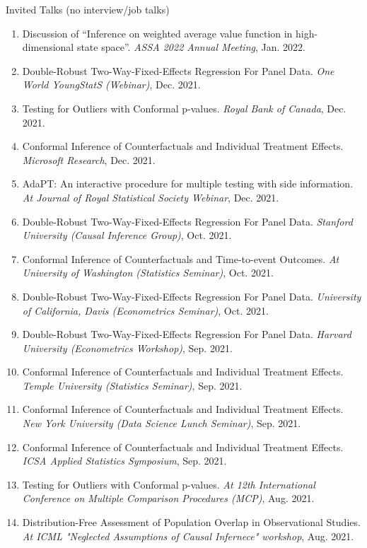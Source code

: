 \documentclass{article}
\begin{document}
\begin{large}
\noindent Invited Talks (no interview/job talks)
\end{large}

\begin{enumerate}
\item Discussion of ``Inference on weighted average value function in high-dimensional state space''. \emph{ASSA 2022 Annual Meeting}, Jan. 2022.
\item Double-Robust Two-Way-Fixed-Effects Regression For Panel Data. \emph{One World YoungStatS (Webinar)}, Dec. 2021.
\item Testing for Outliers with Conformal p-values. \emph{Royal Bank of Canada}, Dec. 2021.  
\item Conformal Inference of Counterfactuals and Individual Treatment Effects. \emph{Microsoft Research}, Dec. 2021.
\item AdaPT: An interactive procedure for multiple testing with side information. \emph{At Journal of Royal Statistical Society Webinar}, Dec. 2021.
\item Double-Robust Two-Way-Fixed-Effects Regression For Panel Data. \emph{Stanford University (Causal Inference Group)}, Oct. 2021.
\item Conformal Inference of Counterfactuals and Time-to-event Outcomes. \emph{At University of Washington (Statistics Seminar)}, Oct. 2021.
\item Double-Robust Two-Way-Fixed-Effects Regression For Panel Data. \emph{University of California, Davis (Econometrics Seminar)}, Oct. 2021.
\item Double-Robust Two-Way-Fixed-Effects Regression For Panel Data. \emph{Harvard University (Econometrics Workshop)}, Sep. 2021.
\item Conformal Inference of Counterfactuals and Individual Treatment Effects. \emph{Temple University (Statistics Seminar)}, Sep. 2021.
\item Conformal Inference of Counterfactuals and Individual Treatment Effects. \emph{New York University (Data Science Lunch Seminar)}, Sep. 2021.
\item Conformal Inference of Counterfactuals and Individual Treatment Effects. \emph{ICSA Applied Statistics Symposium}, Sep. 2021.
\item Testing for Outliers with Conformal p-values. \emph{At 12th International Conference on Multiple Comparison Procedures (MCP)}, Aug. 2021.
\item Distribution-Free Assessment of Population Overlap in Observational Studies. \emph{At ICML "Neglected Assumptions of Causal Infernece" workshop}, Aug. 2021.

\end{enumerate}
\end{document}
